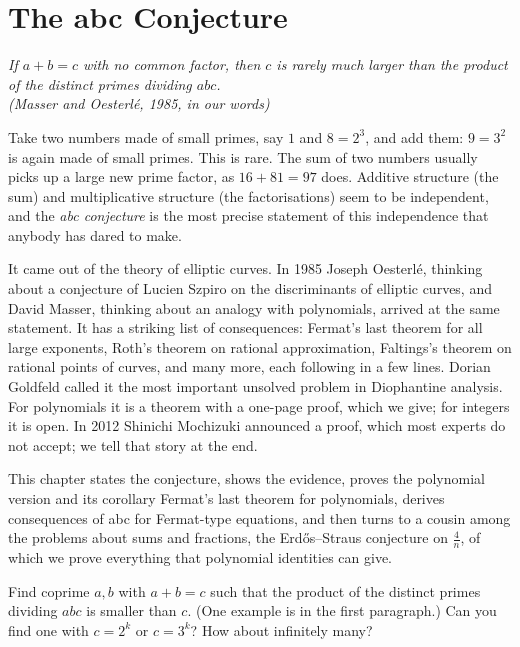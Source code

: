 \chapter{The abc Conjecture}\label{ch:abc}

\begin{center}\itshape
If $a+b=c$ with no common factor, then $c$ is rarely much larger than the product of the distinct primes dividing $abc$.\\
\upshape(Masser and Oesterl\'e, 1985, in our words)
\end{center}

Take two numbers made of small primes, say $1$ and $8=2^3$, and add them: $9=3^2$ is again made of small primes. This is rare. The sum of two
numbers usually picks up a large new prime factor, as $16+81=97$ does. Additive structure (the sum) and multiplicative structure (the factorisations)
seem to be independent, and the \emph{abc conjecture} is the most precise statement of this independence that anybody has dared to make.

It came out of the theory of elliptic curves. In 1985 Joseph Oesterl\'e, thinking about a conjecture of Lucien Szpiro on the discriminants of elliptic
curves, and David Masser, thinking about an analogy with polynomials, arrived at the same statement. It has a striking list of consequences: Fermat's
last theorem for all large exponents, Roth's theorem on rational approximation, Faltings's theorem on rational points of curves, and many more, each
following in a few lines. Dorian Goldfeld called it the most important unsolved problem in Diophantine analysis. For polynomials it is a theorem with a
one-page proof, which we give; for integers it is open. In 2012 Shinichi Mochizuki announced a proof, which most experts do not accept; we tell that story
at the end.

This chapter states the conjecture, shows the evidence, proves the polynomial version and its corollary Fermat's last theorem for polynomials, derives
consequences of abc for Fermat-type equations, and then turns to a cousin among the problems about sums and fractions, the Erd\H os--Straus conjecture
on $\frac4n$, of which we prove everything that polynomial identities can give.

\begin{think}
Find coprime $a,b$ with $a+b=c$ such that the product of the distinct primes dividing $abc$ is smaller than $c$. (One example is in the first paragraph.)
Can you find one with $c=2^k$ or $c=3^k$? How about infinitely many?
\end{think}

